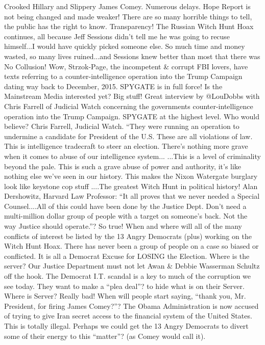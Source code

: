 Crooked Hillary and Slippery James Comey. Numerous delays. Hope Report
is not being changed and made weaker! There are so many horrible things
to tell, the public has the right to know. Transparency! The Russian
Witch Hunt Hoax continues, all because Jeff Sessions didn't tell me he
was going to recuse himself...I would have quickly picked someone else.
So much time and money wasted, so many lives ruined...and Sessions knew
better than most that there was No Collusion! Wow, Strzok-Page, the
incompetent \& corrupt FBI lovers, have texts referring to a
counter-intelligence operation into the Trump Campaign dating way back
to December, 2015. SPYGATE is in full force! Is the Mainstream Media
interested yet? Big stuff! Great interview by @LouDobbs with Chris
Farrell of Judicial Watch concerning the governments
counter-intelligence operation into the Trump Campaign. SPYGATE at the
highest level. Who would believe? Chris Farrell, Judicial Watch. ``They
were running an operation to undermine a candidate for President of the
U.S. These are all violations of law. This is intelligence tradecraft to
steer an election. There's nothing more grave when it comes to abuse of
our intelligence system... ...This is a level of criminality beyond the
pale. This is such a grave abuse of power and authority, it's like
nothing else we've seen in our history. This makes the Nixon Watergate
burglary look like keystone cop stuff ....The greatest Witch Hunt in
political history! Alan Dershowitz, Harvard Law Professor: ``It all
proves that we never needed a Special Counsel....All of this could have
been done by the Justice Dept. Don't need a multi-million dollar group
of people with a target on someone's back. Not the way Justice should
operate.''? So true! When and where will all of the many conflicts of
interest be listed by the 13 Angry Democrats (plus) working on the Witch
Hunt Hoax. There has never been a group of people on a case so biased or
conflicted. It is all a Democrat Excuse for LOSING the Election. Where
is the server? Our Justice Department must not let Awan \& Debbie
Wasserman Schultz off the hook. The Democrat I.T. scandal is a key to
much of the corruption we see today. They want to make a ``plea deal''?
to hide what is on their Server. Where is Server? Really bad! When will
people start saying, ``thank you, Mr. President, for firing James
Comey?''? The Obama Administration is now accused of trying to give Iran
secret access to the financial system of the United States. This is
totally illegal. Perhaps we could get the 13 Angry Democrats to divert
some of their energy to this ``matter''? (as Comey would call it).
